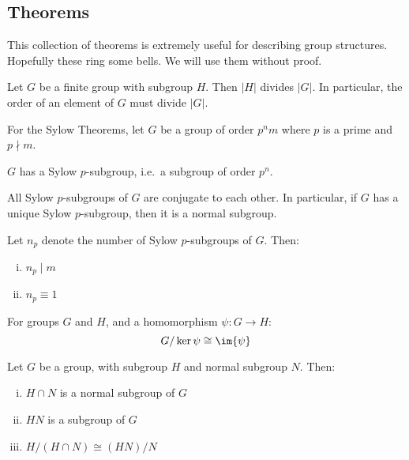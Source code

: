 \subsection{Theorems}

This collection of theorems is extremely useful for describing group structures.
Hopefully these ring some bells.
We will use them without proof.

\begin{theorem}
    \raggedright
    Let \(G\) be a finite group with subgroup \(H\).
    Then \(|H|\) divides \(|G|\).
    In particular, the order of an element of \(G\) must divide \(|G|\).
\end{theorem}

For the Sylow Theorems, let \(G\) be a group of order \(p^n m\) where \(p\) is a prime and \(p\nmid m\).
\begin{theorem}\label{thm:sylow1}
    \raggedright
    \(G\) has a Sylow \(p\)-subgroup, i.e.\ a subgroup of order \(p^n\).
\end{theorem}
\begin{theorem}\label{thm:sylow2}
    \raggedright
    All Sylow \(p\)-subgroups of \(G\) are conjugate to each other.
    In particular, if \(G\) has a unique Sylow \(p\)-subgroup, then it is a normal subgroup.
\end{theorem}
\begin{theorem}\label{thm:sylow3}
    \raggedright
    Let \(n_p\) denote the number of Sylow \(p\)-subgroups of \(G\).
    Then:
    \begin{enumerate}[(i)]
        \item \(n_p \mid m\)
        \item \(n_p\equiv 1\) \)
    \end{enumerate}
\end{theorem}

\begin{theorem}\label{thm:iso1}
    \raggedright
    For groups \(G\) and \(H\), and a homomorphism \(\psi:G \to H\):
    \[G / \ker{\psi} \cong \im{\psi}\]
\end{theorem}

\begin{theorem}\label{thm:iso2}
    \raggedright
    Let \(G\) be a group, with subgroup \(H\) and normal subgroup \(N\).
    Then:
    \begin{enumerate}[(i)]
        \item \(H \cap N\) is a normal subgroup of \(G\)
        \item \(HN\) is a subgroup of \(G\)
        \item \(H / (H \cap N) \cong (HN) / N\)
    \end{enumerate}
\end{theorem}

